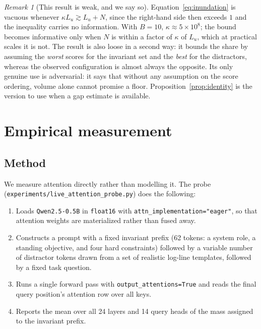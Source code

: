 \documentclass[11pt,a4paper]{article}
\theoremstyle{plain}
\theoremstyle{definition}
\theoremstyle{remark}
\newtheorem{remark}{Remark}
\begin{document}
\begin{remark}[This result is weak, and we say so]
\label{rem:weak}
Equation~\eqref{eq:inundation} is vacuous whenever
$\kappa L_u \gtrsim L_u + N$, since the right-hand side then exceeds $1$ and the
inequality carries no information. With $B = 10$, $\kappa \approx 5\times 10^{8}$;
the bound becomes informative only when $N$ is within a factor of $\kappa$ of
$L_u$, which at practical scales it is not. The result is also loose in a second
way: it bounds the share by assuming the \emph{worst} scores for the invariant
set and the \emph{best} for the distractors, whereas the observed configuration
is almost always the opposite. Its only genuine use is adversarial: it says that
without any assumption on the score ordering, volume alone cannot promise a
floor. Proposition~\ref{prop:identity} is the version to use when a gap estimate
is available.
\end{remark}

\section{Empirical measurement}
\label{sec:empirical}

\subsection{Method}

We measure attention directly rather than modelling it. The probe
(\texttt{experiments/live\_attention\_probe.py}) does the following:

\begin{enumerate}[label=(\arabic*), leftmargin=*]
  \item Loads \texttt{Qwen2.5-0.5B} in \texttt{float16} with
        \texttt{attn\_implementation="eager"}, so that attention weights are
        materialized rather than fused away.
  \item Constructs a prompt with a fixed invariant prefix (62 tokens: a system
        role, a standing objective, and four hard constraints) followed by a
        variable number of distractor tokens drawn from a set of realistic
        log-line templates, followed by a fixed task question.
  \item Runs a single forward pass with \texttt{output\_attentions=True} and
        reads the final query position's attention row over all keys.
  \item Reports the mean over all 24 layers and 14 query heads of the mass
        assigned to the invariant prefix.
\end{enumerate}
\end{document}
